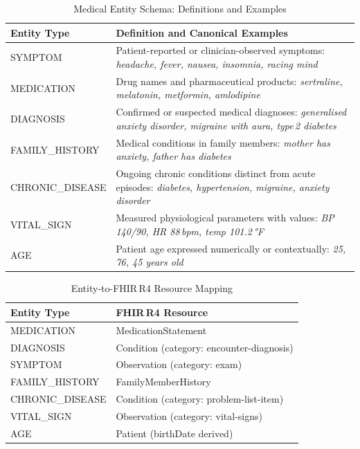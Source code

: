 \documentclass[conference]{IEEEtran}
\begin{document}
\begin{table}[t]
\centering
\caption{Medical Entity Schema: Definitions and Examples}
\label{tab:schema}
\setlength{\tabcolsep}{5pt}
\begin{tabularx}{\columnwidth}{lX}
\toprule
\textbf{Entity Type} & \textbf{Definition and Canonical Examples} \\
\midrule
SYMPTOM & Patient-reported or clinician-observed symptoms:
  \textit{headache, fever, nausea, insomnia, racing mind} \\[2pt]
MEDICATION & Drug names and pharmaceutical products:
  \textit{sertraline, melatonin, metformin, amlodipine} \\[2pt]
DIAGNOSIS & Confirmed or suspected medical diagnoses:
  \textit{generalised anxiety disorder, migraine with aura, type\,2 diabetes} \\[2pt]
FAMILY\_HISTORY & Medical conditions in family members:
  \textit{mother has anxiety, father has diabetes} \\[2pt]
CHRONIC\_DISEASE & Ongoing chronic conditions distinct from acute episodes:
  \textit{diabetes, hypertension, migraine, anxiety disorder} \\[2pt]
VITAL\_SIGN & Measured physiological parameters with values:
  \textit{BP 140/90, HR 88\,bpm, temp 101.2\,°F} \\[2pt]
AGE & Patient age expressed numerically or contextually:
  \textit{25, 76, 45 years old} \\
\bottomrule
\end{tabularx}
\end{table}

\begin{table}[t]
\centering
\caption{Entity-to-FHIR\,R4 Resource Mapping}
\label{tab:fhir}
\setlength{\tabcolsep}{5pt}
\begin{tabular}{ll}
\toprule
\textbf{Entity Type} & \textbf{FHIR\,R4 Resource} \\
\midrule
MEDICATION       & MedicationStatement \\
DIAGNOSIS        & Condition (category: encounter-diagnosis) \\
SYMPTOM          & Observation (category: exam) \\
FAMILY\_HISTORY  & FamilyMemberHistory \\
CHRONIC\_DISEASE & Condition (category: problem-list-item) \\
VITAL\_SIGN      & Observation (category: vital-signs) \\
AGE              & Patient (birthDate derived) \\
\bottomrule
\end{tabular}
\end{table}
\end{document}
